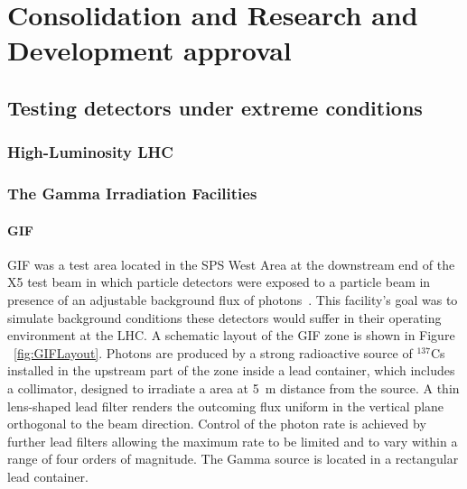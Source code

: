 \graphicspath{{chapt_dutch/}{intro/}{chapt2/}{chapt3/}{chapt4/}{chapt5/}{chapt6/}{chapt7/}{chapt8/}}

\renewcommand\evenpagerightmark{{\scshape\small Chapter 6}}
\renewcommand\oddpageleftmark{{\scshape\small Consolidation and Research and Development approval}}

\hyphenation{}

\chapter[Consolidation and Research and Development approval]%
{Consolidation and Research and Development approval}
\label{chapt:6}

\section{Testing detectors under extreme conditions}
\label{sec:extreme}

	\subsection{High-Luminosity LHC}
	\label{ssec:HL-LHC}

	\subsection{The Gamma Irradiation Facilities}
	\label{ssec:Facilities}
		\subsubsection{GIF}
		\label{sssec:GIF}
		
			GIF was a test area located in the SPS West Area at the downstream end of the X5 test beam in which particle detectors were exposed to a particle beam in presence of an adjustable background flux of photons~\cite{GIFacility}. This facility's goal was to simulate background conditions these detectors would suffer in their operating environment at the LHC. A schematic layout of the GIF zone is shown in Figure ~\ref{fig:GIFLayout}. Photons are produced by a strong radioactive source of $^{137}$Cs installed in the upstream part of the zone inside a lead container, which includes a collimator, designed to irradiate a  area at \SI{5}{\meter} distance from the source. A thin lens-shaped lead filter renders the outcoming flux uniform in the vertical plane orthogonal to the beam direction. Control of the photon rate is achieved by further lead filters allowing the maximum rate to be limited and to vary within a range of four orders of magnitude. The Gamma source is located in a rectangular lead container.
	
